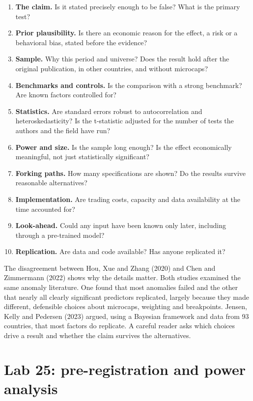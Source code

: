 \begin{enumerate}
  \item \textbf{The claim.} Is it stated precisely enough to be false? What is the primary test?
  \item \textbf{Prior plausibility.} Is there an economic reason for the effect, a risk or a behavioral bias, stated before the evidence?
  \item \textbf{Sample.} Why this period and universe? Does the result hold after the original publication, in other countries, and without microcaps?
  \item \textbf{Benchmarks and controls.} Is the comparison with a strong benchmark? Are known factors controlled for?
  \item \textbf{Statistics.} Are standard errors robust to autocorrelation and heteroskedasticity? Is the t-statistic adjusted for the number of tests the authors and the field have run?
  \item \textbf{Power and size.} Is the sample long enough? Is the effect economically meaningful, not just statistically significant?
  \item \textbf{Forking paths.} How many specifications are shown? Do the results survive reasonable alternatives?
  \item \textbf{Implementation.} Are trading costs, capacity and data availability at the time accounted for?
  \item \textbf{Look-ahead.} Could any input have been known only later, including through a pre-trained model?
  \item \textbf{Replication.} Are data and code available? Has anyone replicated it?
\end{enumerate}

The disagreement between Hou, Xue and Zhang (2020) and Chen and Zimmermann (2022) shows why the details matter. Both studies examined the same anomaly literature. One found that most anomalies failed and the other that nearly all clearly significant predictors replicated, largely because they made different, defensible choices about microcaps, weighting and breakpoints. Jensen, Kelly and Pedersen (2023) argued, using a Bayesian framework and data from 93 countries, that most factors do replicate. A careful reader asks which choices drive a result and whether the claim survives the alternatives.

\section{Lab 25: pre-registration and power analysis}
\label{sec:25-lab}

